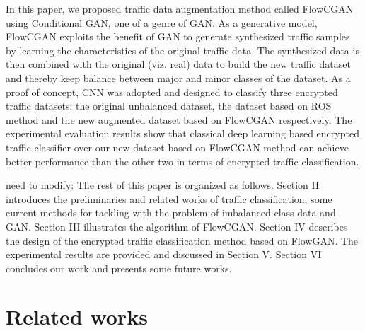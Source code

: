 \documentclass[conference]{IEEEtran}
\begin{document}
In this paper, we proposed traffic data augmentation method called FlowCGAN using Conditional GAN, one of a genre of GAN. As a generative model, FlowCGAN exploits the benefit of GAN to generate synthesized traffic samples by learning the characteristics of the original traffic data. The synthesized data is then combined with the original (viz. real) data to build the new traffic dataset and thereby keep balance between major and minor classes of the dataset. As a proof of concept, CNN was adopted and designed to classify three encrypted traffic datasets: the original unbalanced dataset, the dataset based on ROS~\cite{ROS2004} method and the new augmented dataset based on FlowCGAN respectively. The experimental evaluation results show that classical deep learning based encrypted traffic classifier over our new dataset based on FlowCGAN method can achieve better performance than the other two in terms of encrypted traffic classification.


{\color{red} need to modify:} The rest of this paper is organized as follows. Section II introduces the preliminaries and related works of traffic classification, some current methods for tackling with the problem of imbalanced class data and GAN. Section III illustrates the algorithm of FlowCGAN. Section IV describes the design of the encrypted traffic classification method based on FlowGAN. The experimental results are provided and discussed in Section V. Section VI  concludes our work and presents some future works.


\section{Related works}\label{sec:related_works}
\end{document}
